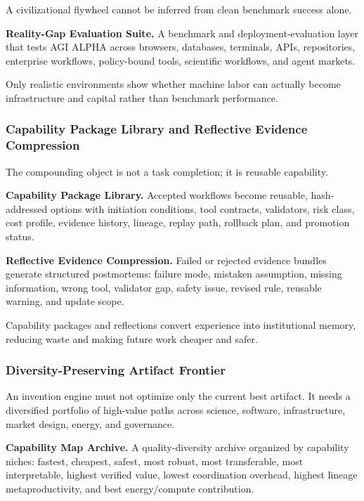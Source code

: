 A civilizational flywheel cannot be inferred from clean benchmark
success alone.

\textbf{Reality-Gap Evaluation Suite.} A benchmark and
deployment-evaluation layer that tests AGI ALPHA across browsers,
databases, terminals, APIs, repositories, enterprise workflows,
policy-bound tools, scientific workflows, and agent markets.

Only realistic environments show whether machine labor can actually
become infrastructure and capital rather than benchmark performance.

\subsubsection{Capability Package Library and Reflective Evidence
Compression}\label{capability-package-library-and-reflective-evidence-compression}

The compounding object is not a task completion; it is reusable
capability.

\textbf{Capability Package Library.} Accepted workflows become reusable,
hash-addressed options with initiation conditions, tool contracts,
validators, risk class, cost profile, evidence history, lineage, replay
path, rollback plan, and promotion status.

\textbf{Reflective Evidence Compression.} Failed or rejected evidence
bundles generate structured postmortems: failure mode, mistaken
assumption, missing information, wrong tool, validator gap, safety
issue, revised rule, reusable warning, and update scope.

Capability packages and reflections convert experience into
institutional memory, reducing waste and making future work cheaper and
safer.

\subsubsection{Diversity-Preserving Artifact
Frontier}\label{diversity-preserving-artifact-frontier}

An invention engine must not optimize only the current best artifact. It
needs a diversified portfolio of high-value paths across science,
software, infrastructure, market design, energy, and governance.

\textbf{Capability Map Archive.} A quality-diversity archive organized
by capability niches: fastest, cheapest, safest, most robust, most
transferable, most interpretable, highest verified value, lowest
coordination overhead, highest lineage metaproductivity, and best
energy/compute contribution.

